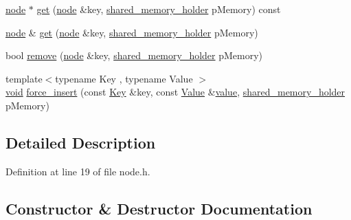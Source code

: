 \begin{DoxyCompactItemize}
\item 
\mbox{\hyperlink{class_y_a_m_l_1_1detail_1_1node}{node}} $\ast$ \mbox{\hyperlink{class_y_a_m_l_1_1detail_1_1node_aae5710fc2a71d0d4d0a46da3cb7ec06b}{get}} (\mbox{\hyperlink{class_y_a_m_l_1_1detail_1_1node}{node}} \&key, \mbox{\hyperlink{namespace_y_a_m_l_1_1detail_a228c4b3b6ba1058b474d40afc218e21d}{shared\+\_\+memory\+\_\+holder}} p\+Memory) const
\item 
\mbox{\hyperlink{class_y_a_m_l_1_1detail_1_1node}{node}} \& \mbox{\hyperlink{class_y_a_m_l_1_1detail_1_1node_af509ee1699111cde57b6c30255a377a5}{get}} (\mbox{\hyperlink{class_y_a_m_l_1_1detail_1_1node}{node}} \&key, \mbox{\hyperlink{namespace_y_a_m_l_1_1detail_a228c4b3b6ba1058b474d40afc218e21d}{shared\+\_\+memory\+\_\+holder}} p\+Memory)
\item 
bool \mbox{\hyperlink{class_y_a_m_l_1_1detail_1_1node_a76e13e6b6f7b6be8dc9a981da9e47b3e}{remove}} (\mbox{\hyperlink{class_y_a_m_l_1_1detail_1_1node}{node}} \&key, \mbox{\hyperlink{namespace_y_a_m_l_1_1detail_a228c4b3b6ba1058b474d40afc218e21d}{shared\+\_\+memory\+\_\+holder}} p\+Memory)
\item 
{\footnotesize template$<$typename Key , typename Value $>$ }\\\mbox{\hyperlink{glad_8h_a950fc91edb4504f62f1c577bf4727c29}{void}} \mbox{\hyperlink{class_y_a_m_l_1_1detail_1_1node_a35f641db9ee6d3cae39350f0923afd4d}{force\+\_\+insert}} (const \mbox{\hyperlink{namespace_y_a_m_l_a67c320aa50d3de7ecba1d0b8775dd684a1af533fc24b0311b8c4d5ac2870283aa}{Key}} \&key, const \mbox{\hyperlink{namespace_y_a_m_l_a67c320aa50d3de7ecba1d0b8775dd684a0d29a86853d6a9cfe0241ab7ea8da97c}{Value}} \&\mbox{\hyperlink{glad_8h_a03aff08f73d7fde3d1a08e0abd8e84fa}{value}}, \mbox{\hyperlink{namespace_y_a_m_l_1_1detail_a228c4b3b6ba1058b474d40afc218e21d}{shared\+\_\+memory\+\_\+holder}} p\+Memory)
\end{DoxyCompactItemize}


\subsection{Detailed Description}


Definition at line 19 of file node.\+h.



\subsection{Constructor \& Destructor Documentation}
\mbox{\label{class_y_a_m_l_1_1detail_1_1node_a91b767e9ac6981ac7084ef9a982857a8}} 
